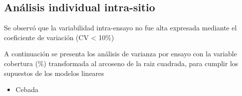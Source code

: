\documentclass[
  letterpaper,
  DIV=11,
  numbers=noendperiod]{scrreprt}
\providecommand{\tightlist}{%
  \setlength{\itemsep}{0pt}\setlength{\parskip}{0pt}}\usepackage{longtable,booktabs,array}
\begin{document}
\hypertarget{anuxe1lisis-individual-intra-sitio}{%
\subsection*{Análisis individual
intra-sitio}\label{anuxe1lisis-individual-intra-sitio}}

Se observó que la variabilidad intra-ensayo no fue alta expresada
mediante el coeficiente de variación (CV \textless{} 10\%)

A continuación se presenta los análisis de varianza por ensayo con la
variable cobertura (\%) transformada al arcoseno de la raiz cuadrada,
para cumplir los supuestos de los modelos lineares

\begin{itemize}
\tightlist
\item
  Cebada
\end{itemize}

 
  \providecommand{\huxb}[2]{\arrayrulecolor[RGB]{#1}\global\arrayrulewidth=#2pt}
  \providecommand{\huxvb}[2]{\color[RGB]{#1}\vrule width #2pt}
  \providecommand{\huxtpad}[1]{\rule{0pt}{#1}}
  \providecommand{\huxbpad}[1]{\rule[-#1]{0pt}{#1}}
\end{document}
